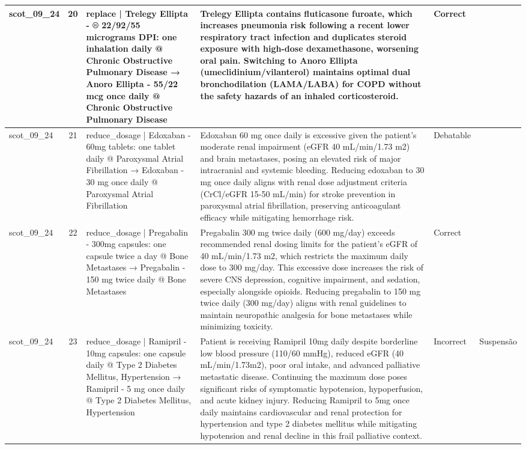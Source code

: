 \begin{longtable}{|p{1.45cm}|c|p{3.3cm}|p{6.5cm}|p{1.55cm}|p{2.3cm}|}
\hline
scot\_09\_24 & 20 & replace | Trelegy Ellipta - ® 22/92/55 micrograms DPI: one inhalation daily @ Chronic Obstructive Pulmonary Disease → Anoro Ellipta - 55/22 mcg once daily @ Chronic Obstructive Pulmonary Disease & Trelegy Ellipta contains fluticasone furoate, which increases pneumonia risk following a recent lower respiratory tract infection and duplicates steroid exposure with high-dose dexamethasone, worsening oral pain. Switching to Anoro Ellipta (umeclidinium/vilanterol) maintains optimal dual bronchodilation (LAMA/LABA) for COPD without the safety hazards of an inhaled corticosteroid. & Correct &  \\
\hline
scot\_09\_24 & 21 & reduce\_dosage | Edoxaban - 60mg tablets: one tablet daily @ Paroxysmal Atrial Fibrillation → Edoxaban - 30 mg once daily @ Paroxysmal Atrial Fibrillation & Edoxaban 60 mg once daily is excessive given the patient's moderate renal impairment (eGFR 40 mL/min/1.73 m2) and brain metastases, posing an elevated risk of major intracranial and systemic bleeding. Reducing edoxaban to 30 mg once daily aligns with renal dose adjustment criteria (CrCl/eGFR 15-50 mL/min) for stroke prevention in paroxysmal atrial fibrillation, preserving anticoagulant efficacy while mitigating hemorrhage risk. & Debatable &  \\
\hline
scot\_09\_24 & 22 & reduce\_dosage | Pregabalin - 300mg capsules: one capsule twice a day @ Bone Metastases → Pregabalin - 150 mg twice daily @ Bone Metastases & Pregabalin 300 mg twice daily (600 mg/day) exceeds recommended renal dosing limits for the patient's eGFR of 40 mL/min/1.73 m2, which restricts the maximum daily dose to 300 mg/day. This excessive dose increases the risk of severe CNS depression, cognitive impairment, and sedation, especially alongside opioids. Reducing pregabalin to 150 mg twice daily (300 mg/day) aligns with renal guidelines to maintain neuropathic analgesia for bone metastases while minimizing toxicity. & Correct &  \\
\hline
scot\_09\_24 & 23 & reduce\_dosage | Ramipril - 10mg capsules: one capsule daily @ Type 2 Diabetes Mellitus, Hypertension → Ramipril - 5 mg once daily @ Type 2 Diabetes Mellitus, Hypertension & Patient is receiving Ramipril 10mg daily despite borderline low blood pressure (110/60 mmHg), reduced eGFR (40 mL/min/1.73m2), poor oral intake, and advanced palliative metastatic disease. Continuing the maximum dose poses significant risks of symptomatic hypotension, hypoperfusion, and acute kidney injury. Reducing Ramipril to 5mg once daily maintains cardiovascular and renal protection for hypertension and type 2 diabetes mellitus while mitigating hypotension and renal decline in this frail palliative context. & Incorrect & Suspensão \\

\end{longtable}
